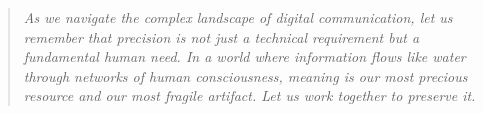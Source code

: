 \documentclass[11pt]{article}
\begin{document}
\vfill

\begin{quote}
\emph{As we navigate the complex landscape of digital communication, let us remember that precision is not just a technical requirement but a fundamental human need. In a world where information flows like water through networks of human consciousness, meaning is our most precious resource and our most fragile artifact. Let us work together to preserve it.}
\end{quote}
\end{document}
